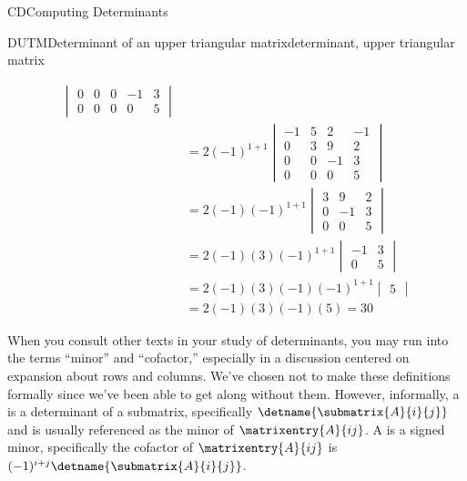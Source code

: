\begin{subsect}{CD}{Computing Determinants}
\begin{example}{DUTM}{Determinant of an upper triangular matrix}{determinant, upper triangular matrix}
\begin{para}
\begin{align*}
\begin{vmatrix}
0 & 0 & 0 & -1 & 3\\
0 & 0 & 0 & 0 & 5
\end{vmatrix}\\
%
&=2(-1)^{1+1}
\begin{vmatrix}
-1 & 5 & 2 & -1\\
 0 & 3 & 9 & 2\\
 0 & 0 & -1 & 3\\
 0 & 0 & 0 & 5
\end{vmatrix}\\
%
&=2(-1)(-1)^{1+1}
\begin{vmatrix}
 3 & 9 & 2\\
 0 & -1 & 3\\
 0 & 0 & 5
\end{vmatrix}\\
%
&=2(-1)(3)(-1)^{1+1}
\begin{vmatrix}
 -1 & 3\\
 0 & 5
\end{vmatrix}\\
%
&=2(-1)(3)(-1)(-1)^{1+1}
\begin{vmatrix}
5
\end{vmatrix}\\
%
&=2(-1)(3)(-1)(5)=30
\end{align*}
\end{para}
%
\end{example}
%
\begin{para}When you consult other texts in your study of determinants, you may run into the terms ``minor'' and ``cofactor,'' especially in a discussion centered on expansion about rows and columns.  We've chosen not to make these definitions formally since we've been able to get along without them.  However, informally, a  is a determinant of a submatrix, specifically $\detname{\submatrix{A}{i}{j}}$ and is usually referenced as the minor of $\matrixentry{A}{ij}$.  A  is a signed minor, specifically the cofactor of $\matrixentry{A}{ij}$ is $(-1)^{i+j}\detname{\submatrix{A}{i}{j}}$.\end{para}
%
%
\end{subsect}
%
